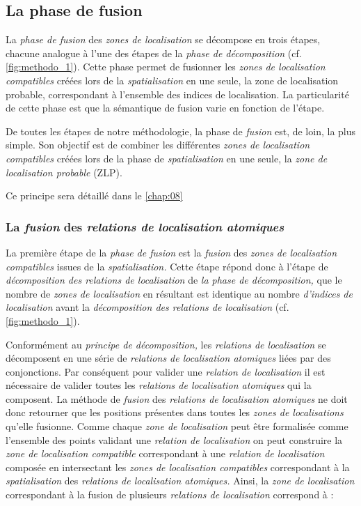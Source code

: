 \subsection{La phase de fusion}

La \emph{phase de fusion} des \emph{zones de localisation} se
décompose en trois étapes, chacune analogue à l'une des étapes de la
\emph{phase de décomposition} (cf. \autoref{fig:methodo_1}). Cette
phase permet de fusionner les \emph{zones de localisation compatibles}
créées lors de la \emph{spatialisation} en une seule, la zone de
localisation probable, correspondant à l'ensemble des indices de
localisation. La particularité de cette phase est que la sémantique de
fusion varie en fonction de l'étape. 



De toutes les étapes de notre méthodologie, la phase de \emph{fusion}
est, de loin, la plus simple. Son objectif est de combiner les
différentes \emph{zones de localisation compatibles} créées lors de la
phase de \emph{spatialisation} en une seule, la \emph{zone de
  localisation probable} (ZLP).

Ce principe sera détaillé dans le \autoref{chap:08}


\subsubsection{La \emph{fusion} des \emph{relations de localisation
    atomiques}}

La première étape de la \emph{phase de fusion} est la \emph{fusion}
des \emph{zones de localisation compatibles} issues de la
\emph{spatialisation.} Cette étape répond donc à l'étape de
\emph{décomposition des relations de localisation} de \emph{la phase
  de décomposition,} \ie que le nombre de \emph{zones de localisation}
en résultant est identique au nombre \emph{d'indices de localisation}
avant la \emph{décomposition des relations de localisation}
(cf. \autoref{fig:methodo_1}).

Conformément au \emph{principe de décomposition,} les \emph{relations
  de localisation} se décomposent en une série de \emph{relations de
  localisation atomiques} liées par des conjonctions. Par conséquent
pour valider une \emph{relation de localisation} il est nécessaire de
valider toutes les \emph{relations de localisation atomiques} qui la
composent. La méthode de \emph{fusion} des \emph{relations de
  localisation atomiques} ne doit donc retourner que les positions
présentes dans toutes les \emph{zones de localisations} qu'elle
fusionne. Comme chaque \emph{zone de localisation} peut être
formalisée comme l'ensemble des points validant une \emph{relation de
  localisation} on peut construire la \emph{zone de localisation
  compatible} correspondant à une \emph{relation de localisation}
composée en intersectant les \emph{zones de localisation compatibles}
correspondant à la \emph{spatialisation} des \emph{relations de
  localisation atomiques.} Ainsi, la \emph{zone de localisation}
correspondant à la fusion de plusieurs \emph{relations de
  localisation} correspond à :

